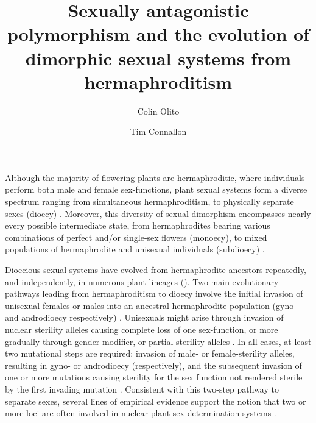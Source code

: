 \documentclass[9pt,twocolumn,twoside,lineno]{gsajnl}
\title{Sexually antagonistic polymorphism and the evolution of dimorphic sexual systems from hermaphroditism}
\author[$\ast$,1]{Colin Olito}
\author[$\ast$]{Tim Connallon}
\affil[$\ast$]{Department of Biological Sciences, Monash University, Melbourne, VIC 3800, Australia}
\begin{document}
\maketitle
\thispagestyle{firststyle}
\marginmark
\firstpagefootnote
{}
\vspace{-11pt}%

\lettrine[lines=2]{\color{color2}A}{}lthough the majority of flowering plants are hermaphroditic, where individuals perform both male and female sex-functions, plant sexual systems form a diverse spectrum ranging from simultaneous hermaphroditism, to physically separate sexes (dioecy) \citep{Darwin1877,Westergaard1958,Bachtrog2014}. Moreover, this diversity of sexual dimorphism encompasses nearly every possible intermediate state, from hermaphrodites bearing various combinations of perfect and/or single-sex flowers (monoecy), to mixed populations of hermaphrodite and unisexual individuals (subdioecy) \citep{Bawa1980,SakaiWeller1999}.

Dioecious sexual systems have evolved from hermaphrodite ancestors repeatedly, and independently, in numerous plant lineages (\citealt{Westergaard1958,SakaiWeller1999,Charlesworth2006,Bachtrog2014,Renner2014,GoldbergOtto2017, KaferPannell2017}). Two main evolutionary pathways leading from hermaphroditism to dioecy involve the initial invasion of unisexual females or males into an ancestral hermaphrodite population (gyno- and androdioecy respectively) \citep{Charlesworth1978a,Charlesworth1978b}. Unisexuals might arise through invasion of nuclear sterility alleles causing complete loss of one sex-function, or more gradually through gender modifier, or partial sterility alleles \citep{Charlesworth1978a,Charlesworth1978b,Charlesworth1999}. In all cases, at least two mutational steps are required: invasion of male- or female-sterility alleles, resulting in gyno- or androdioecy (respectively), and the subsequent invasion of one or more mutations causing sterility for the sex function not rendered sterile by the first invading mutation \citep{Westergaard1958,Charlesworth1978a,Charlesworth1978b,Charlesworth2006,Charlesworth2009,KaferPannell2017}. Consistent with this two-step pathway to separate sexes, several lines of empirical evidence support the notion that two or more loci are often involved in nuclear plant sex determination systems \citep{Westergaard1958,Charlesworth2002,Charlesworth2006,Renner2014,Ashman2015}.
\end{document}
